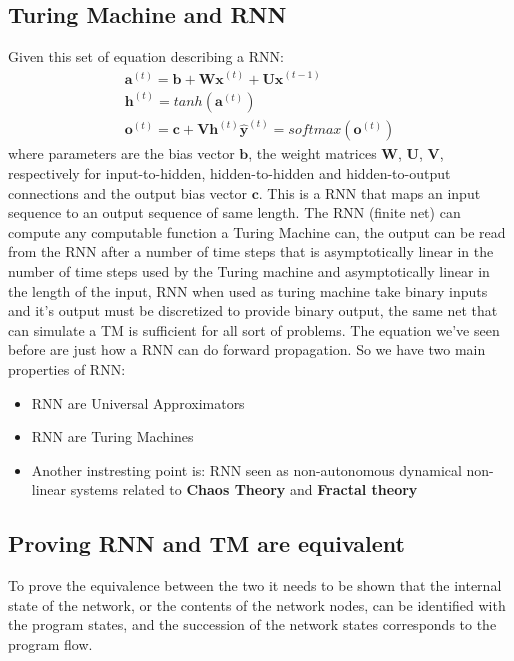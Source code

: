 \documentclass[12pt]{book}
\begin{document}
\subsection{Turing Machine and RNN}
Given this set of equation describing a RNN: 
\begin{equation}
\begin{split}
	\mathbf{a}^{(t)} = \mathbf{b} + \mathbf{Wx}^{(t)} + \mathbf{Ux}^{(t-1)} \\
	\mathbf{h}^{(t)} = tanh(\mathbf{a}^{(t)}) \\
	\mathbf{o}^{(t)} = \mathbf{c} + \mathbf{Vh}^{(t)}
	\mathbf{\hat y}^{(t)} = softmax(\mathbf{o}^{(t)})
\end{split}
\end{equation}
where parameters are the bias vector $\mathbf{b}$, the weight matrices $\mathbf{W}$, $\mathbf{U}$, $\mathbf{V}$, respectively for input-to-hidden, hidden-to-hidden and hidden-to-output connections and the output bias vector $\mathbf{c}$. This is a RNN that maps an input sequence to an output sequence of same length. The RNN (finite net) can compute any computable function a Turing Machine can, the output can be read from the RNN after a number of time steps that is asymptotically linear in the number of time steps used by the Turing machine and asymptotically linear in the length of the input, RNN when used as turing machine take binary inputs and it's output must be discretized to provide binary output, the same net that can simulate a TM is sufficient for all sort of problems. The equation we've seen before are just how a RNN can do forward propagation.
\newline\newline
So we have two main properties of RNN: \newline
\begin{itemize}
	\item RNN are Universal Approximators 
	\item RNN are Turing Machines
	\item Another instresting point is: RNN seen as non-autonomous dynamical non-linear systems related to \textbf{Chaos Theory} and \textbf{Fractal theory}
\end{itemize}

\subsection{Proving RNN and TM are equivalent}
To prove the equivalence between the two it needs to be shown that the internal state of the network, or the contents of the network nodes, can be identified with the program states, and the succession of the network states corresponds to the program flow. 
\end{document}

